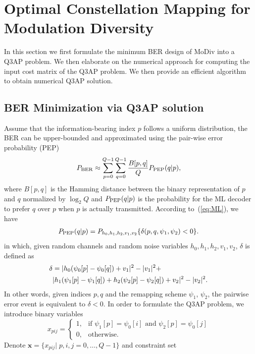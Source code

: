 \documentclass[journal]{IEEEtran}
\newcommand{\PEP}{\rm{PEP}}
\newcommand{\BER}{\rm{BER}}
\begin{document}
\section{Optimal Constellation Mapping for Modulation Diversity}
\label{sec:core}
In this section we first formulate the minimum BER design of MoDiv into a Q3AP
problem. We then elaborate on the numerical approach for computing the input
cost matrix of the Q3AP problem. We then provide an efficient algorithm to
obtain numerical Q3AP solution.

\subsection{BER Minimization via Q3AP solution}
Assume that the information-bearing index $p$ follows a uniform distribution,
the BER can be upper-bounded and approximated using the pair-wise error
probability (PEP)~\cite{harvind2005symbol}
\begin{align}
    P_{\BER} \approx \sum_{p=0}^{Q - 1}\sum_{q=0}^{Q - 1}\frac{B[p,
    q]}{Q}P_{\PEP}(q | p), \label{eq:P_BER}
\end{align}
where $B[p,q]$ is the Hamming distance between the binary representation of $p$
and $q$ normalized by $\log_2Q$ and $P_{\PEP}(q | p)$ is the probability for the
ML decoder to prefer $q$ over $p$ when $p$ is actually transmitted. According
to~(\ref{eq:ML}), we have
\begin{align}
    P_{\PEP}(q | p) = P_{h_0,h_1,h_2,v_1,v_2}\{\delta(p,q,\psi_1,\psi_2) < 0\}.
    \label{eq:P_PEP}
\end{align}
in which, given random channels and random noise variables 
$h_0,h_1,h_2,v_1,v_2$, $\delta$ is defined as
\begin{align}
    \delta & = |h_0(\psi_0[p] - \psi_0[q]) + v_1|^2 - |v_1|^2 +\notag\\ 
    &
    |h_1(\psi_1[p] - \psi_1[q])+h_2(\psi_2[p] - \psi_2[q])+v_2|^2 -
    |v_2|^2.
    \label{eq:delta}
\end{align}
In other words, given indices $p, q$ and the remapping scheme $\psi_1$,
$\psi_2$, the pairwise error event is equivalent to $\delta<0$. In order to
formulate the Q3AP problem, we introduce binary variables
\[
    x_{pij}= \left\{\begin{array}{ll}
        1,& \mbox{if $\psi_1[p] = \psi_0[i]$ and $\psi_2[p] = \psi_0[j]$}\\
        0,& \mbox{otherwise.} 
   \end{array} \right.
 \]
Denote $\mathbf{x} = \{x_{pij}|\;p,i,j=0,\ldots,Q-1\}$ and constraint set
\end{document}
